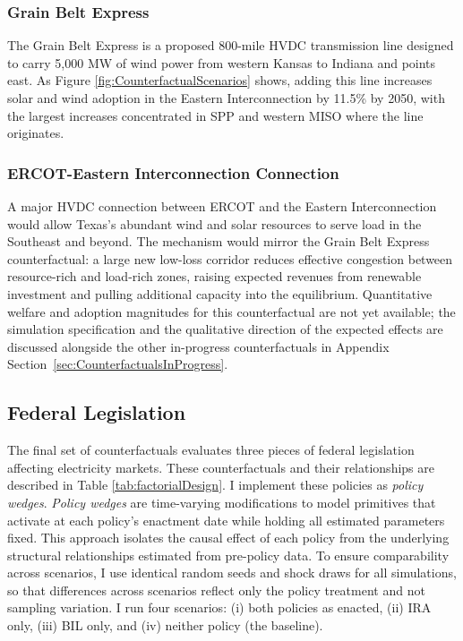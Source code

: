 \documentclass[12pt]{article}
\begin{document}
\subsubsection{Grain Belt Express}

The Grain Belt Express is a proposed 800-mile HVDC transmission line designed to carry 5,000 MW of wind power from western Kansas to Indiana and points east. As Figure \ref{fig:CounterfactualScenarios} shows, adding this line increases solar and wind adoption in the Eastern Interconnection by 11.5\% by 2050, with the largest increases concentrated in SPP and western MISO where the line originates.


\subsubsection{ERCOT-Eastern Interconnection Connection}

A major HVDC connection between ERCOT and the Eastern Interconnection would allow Texas's abundant wind and solar resources to serve load in the Southeast and beyond. The mechanism would mirror the Grain Belt Express counterfactual: a large new low-loss corridor reduces effective congestion between resource-rich and load-rich zones, raising expected revenues from renewable investment and pulling additional capacity into the equilibrium. Quantitative welfare and adoption magnitudes for this counterfactual are not yet available; the simulation specification and the qualitative direction of the expected effects are discussed alongside the other in-progress counterfactuals in Appendix Section~\ref{sec:CounterfactualsInProgress}.

\subsection{Federal Legislation}\label{LegCounts}

The final set of counterfactuals evaluates three pieces of federal legislation affecting electricity markets. These counterfactuals and their relationships are described in Table \ref{tab:factorialDesign}. I implement these policies as \textit{policy wedges}. \textit{Policy wedges} are time-varying modifications to model primitives that activate at each policy's enactment date while holding all estimated parameters fixed. This approach isolates the causal effect of each policy from the underlying structural relationships estimated from pre-policy data. To ensure comparability across scenarios, I use identical random seeds and shock draws for all simulations, so that differences across scenarios reflect only the policy treatment and not sampling variation. I run four scenarios: (i) both policies as enacted, (ii) IRA only, (iii) BIL only, and (iv) neither policy (the baseline).
\end{document}
